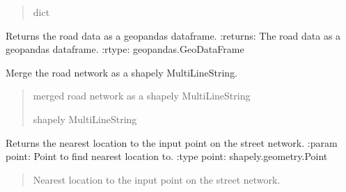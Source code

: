 \documentclass[letterpaper,10pt,english]{sphinxmanual}
\begin{document}
\begin{fulllineitems}
\begin{fulllineitems}
\begin{quote}
\begin{description}
\sphinxAtStartPar
dict

\end{description}\end{quote}

\end{fulllineitems}


\begin{fulllineitems}
\label{\detokenize{pysewer:pysewer.preprocessing.Roads.get_gdf}}
\pysigstartsignatures
{}
\pysigstopsignatures
\sphinxAtStartPar
Returns the road data as a geopandas dataframe.
:returns: The road data as a geopandas dataframe.
:rtype: geopandas.GeoDataFrame

\end{fulllineitems}


\begin{fulllineitems}
\label{\detokenize{pysewer:pysewer.preprocessing.Roads.get_merged_roads}}
\pysigstartsignatures
{}
\pysigstopsignatures
\sphinxAtStartPar
Merge the road network as a shapely MultiLineString.
\begin{quote}\begin{description}
\sphinxAtStartPar
merged road network as a shapely MultiLineString

\sphinxAtStartPar
shapely MultiLineString

\end{description}\end{quote}

\end{fulllineitems}


\begin{fulllineitems}
\label{\detokenize{pysewer:pysewer.preprocessing.Roads.get_nearest_point}}
\pysigstartsignatures
{}
\pysigstopsignatures
\sphinxAtStartPar
Returns the nearest location to the input point on the street network.
:param point: Point to find nearest location to.
:type point: shapely.geometry.Point
\begin{quote}\begin{description}
\sphinxAtStartPar
Nearest location to the input point on the street network.


\end{description}
\end{quote}
\end{fulllineitems}
\end{fulllineitems}
\end{document}
